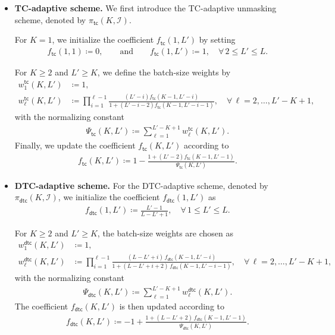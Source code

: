 \documentclass[english]{article}
\newcommand{\defn}{\coloneqq}
\newcommand{\cI}{\mathcal{I}}
\newcommand{\tc}{\mathsf{tc}}
\newcommand{\dtc}{\mathsf{dtc}}
\begin{document}
\begin{itemize}
\item \textbf{TC-adaptive scheme.}
We first introduce the TC-adaptive unmasking scheme, denoted by $\pi_{\tc}(K, \cI)$.

For $K=1$, we initialize the coefficient $f_\tc(1, L')$ by setting
\begin{align}
f_\tc(1, 1) \defn 0, \qquad \text{and} \qquad f_\tc(1, L') \defn 1, \quad \forall\, 2 \leq L' \leq L.
\end{align}

For $K\geq 2$ and $L' \geq K$, we define the batch-size weights by
\begin{subequations}
    \label{eq:wl-tc-def}  
\begin{align}
    w_1^{\tc}(K,L') &\defn 1, \\
    w_\ell^{\tc}(K,L') &\defn \prod_{i = 1}^{\ell-1}  \frac{(L'-i)f_\tc(K-1,L'-i)}{1 + (L' - i - 2)f_\tc(K-1,L'-i-1)}, \quad \forall\,\ell = 2, \ldots, L'-K+1,
\end{align}
\end{subequations}
with the normalizing constant 
\begin{align}\label{eq:Psi-tc-def} 
\Psi_\tc(K,L') \defn \sum_{\ell=1}^{L'-K+1} w_\ell^{\tc}(K,L').
\end{align}
Finally, we update the coefficient $f_\tc(K,L')$ according to
\begin{align}\label{eq:f-def}
f_\tc(K,L') \defn 1-\frac{1 + (L'-2)f_\tc(K-1,L'-1)}{\Psi_\tc(K,L')}.
\end{align}

\item \textbf{DTC-adaptive scheme.}
For the DTC-adaptive scheme, denoted by $\pi_\dtc(K,\cI)$, we initialize the coefficient $f_\dtc(1, L')$ as
\begin{align}
f_\dtc(1, L') \defn \frac{L'-1}{L-L'+1}, \quad \forall\,1 \leq L' \leq L.
\end{align}

For $K\geq 2$ and $L' \geq K$, the batch-size weights are chosen as
\begin{subequations}
    \label{eq:wl-dtc-def}  
\begin{align}
    w_1^{\dtc}(K,L') &\defn 1, \\
    w_\ell^{\dtc}(K,L') &\defn \prod_{i = 1}^{\ell-1} \frac{(L-L'+i)\,f_\dtc(K-1, L'-i)}{1 + (L-L'+i+2)\,f_\dtc(K-1, L'-i-1)},\quad \forall\,\ell = 2, \ldots, L'-K+1,
\end{align}
\end{subequations}
with the normalizing constant 
\begin{align}\label{eq:Psi-dtc-def} 
\Psi_\dtc(K,L') \defn \sum_{\ell=1}^{L'-K+1} w_\ell^{\dtc}(K,L').
\end{align}
The coefficient $f_\dtc(K,L')$ is then updated according to
\begin{align}\label{eq:g-def}
f_\dtc(K,L') \defn -1+\frac{1 + (L - L' + 2)\,f_\dtc(K-1,L'-1)}{\Psi_\dtc(K,L')}.
\end{align}
\end{itemize}
\end{document}
